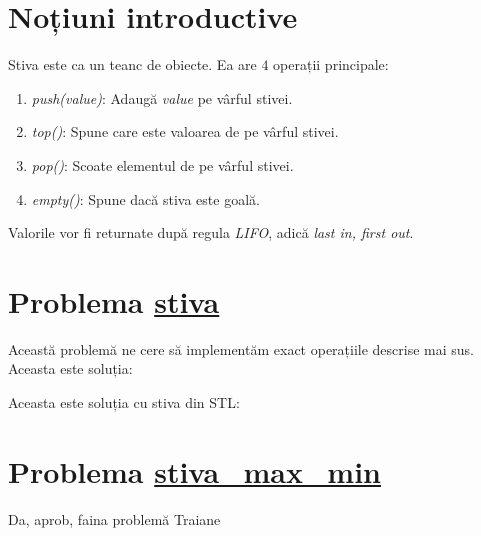 \section{Noțiuni introductive}

Stiva este ca un teanc de obiecte. Ea are $4$ operații principale:
\begin{enumerate}
    \item \textit{push(value)}: Adaugă \textit{value} pe vârful stivei.
    \item \textit{top()}: Spune care este valoarea de pe vârful stivei.
    \item \textit{pop()}: Scoate elementul de pe vârful stivei.
    \item \textit{empty()}: Spune dacă stiva este goală.
\end{enumerate}

\begin{observation}
Valorile vor fi returnate după regula \textit{LIFO}, adică \textit{last in, first out}.
\end{observation}

\section{Problema \href{https://kilonova.ro/problems/2001}{stiva}}

Această problemă ne cere să implementăm exact operațiile descrise mai sus. Aceasta este soluția:

Aceasta este soluția cu stiva din STL:

\section{Problema \href{https://www.youtube.com/watch?v=dQw4w9WgXcQ}{stiva\_max\_min}}
Da, aprob, faina problemă Traiane 